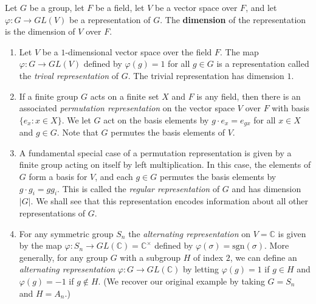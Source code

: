  \begin{defn}Let $G$ be a group, let $F$ be a field, let $V$ be a vector space over $F$, and let $\varphi \colon G \to GL(V)$ be a representation of $G$.  The \textbf{dimension} of the representation is the dimension of $V$ over $F$.  
 \end{defn}
 \begin{example}
 \begin{enumerate}
\item Let $V$ be a $1$-dimensional vector space over the field $F$.  The map $\varphi \colon G \to GL(V)$ defined by $\varphi(g) = 1$ for all $g \in G$ is a representation called the \textit{trival representation} of $G$.  The trivial representation has dimension $1$.

\item If a finite group $G$ acts on a finite set $X$ and $F$ is any field, then there is an associated \textit{permutation representation}  on the vector space $V$ over $F$ with basis $\{e_x \colon x \in X\}$.  We let $G$ act on the basis elements by $g \cdot e_x = e_{gx}$ for all $x \in X$ and $g \in G$. Note that $G$ permutes the basis elements of $V$. 

\item A fundamental special case of a permutation representation is given by a finite group acting on itself by left multiplication.  In this case, the elements of $G$ form a basis for $V$, and each $g \in G$ permutes the basis elements by $g \cdot g_i = gg_i$.  This is called the \textit{regular representation} of $G$ and has dimension $|G|$. We shall see that this representation encodes information about all other representations of $G$.

\item For any symmetric group $S_n$ the \textit{alternating representation} on $V=\mathbb{C}$ is given by the map $\varphi \colon S_n \to GL(\mathbb{C})=\mathbb{C}^\times$ defined by $\varphi(\sigma)=\text{sgn}(\sigma)$. More generally, for any group $G$ with a subgroup $H$ of index $2$, we can define an \textit{alternating representation} $\varphi \colon G \to GL(\mathbb{C})$ by letting $\varphi(g) = 1$ if $g \in H$ and $\varphi(g) = -1$ if $g \notin H$.  (We recover our original example  by taking $G= S_n$ and $H=A_n$.)

\end{enumerate}
 \end{example}


